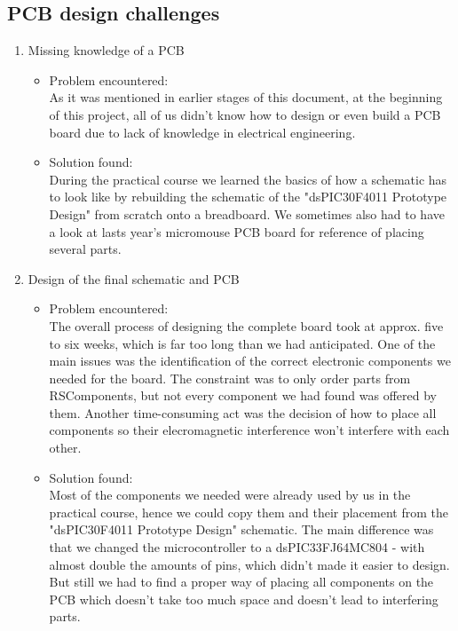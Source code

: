 \subsection{PCB design challenges}
\begin{enumerate}
  \item Missing knowledge of a PCB
    \begin{itemize}
      \item Problem encountered:\\
      As it was mentioned in earlier stages of this document, at the beginning of this project, all of us didn't know how to design or even build a PCB board due to lack of knowledge in electrical engineering. 
      \item Solution found:\\
      During the practical course we learned the basics of how a schematic has to look like by rebuilding the schematic of the "dsPIC30F4011 Prototype Design" from scratch onto a breadboard. We sometimes also had to have a look at lasts year's micromouse PCB board for reference of placing several parts. 
    \end{itemize}
  \item Design of the final schematic and PCB
    \begin{itemize}
      \item Problem encountered:\\
      The overall process of designing the complete board took at approx. five to six weeks, which is far too long than we had anticipated. One of the main issues was the identification of the correct electronic components we needed for the board. The constraint was to only order parts from RSComponents, but not every component we had found was offered by them.
      Another time-consuming act was the decision of how to place all components so their elecromagnetic interference won't interfere with each other.
      \item Solution found:\\
      Most of the components we needed were already used by us in the practical course, hence we could copy them and their placement from the "dsPIC30F4011 Prototype Design" schematic. The main difference was that we changed the microcontroller to a dsPIC33FJ64MC804 - with almost double the amounts of pins, which didn't made it easier to design. But still we had to find a proper way of placing all components on the PCB which doesn't take too much space and doesn't lead to interfering parts.
    \end{itemize}

\end{enumerate}
